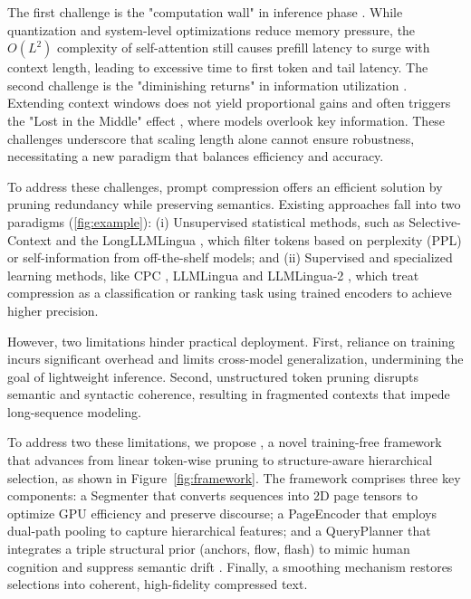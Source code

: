 \documentclass[11pt]{article}
\newcommand{\ours}{\text{BEAVER}\xspace}
\begin{document}
The first challenge is the "computation wall" in inference phase \cite{dao2022flashattention,zhao2025mofa}. While quantization \cite{lin2024awq} and system-level optimizations \cite{kwon2023efficient} reduce memory pressure, the $O(L^2)$ complexity of self-attention still causes prefill latency to surge with context length, leading to excessive time to first token and tail latency. The second challenge is the "diminishing returns" in information utilization \cite{sinha2025illusion}. Extending context windows does not yield proportional gains and often triggers the "Lost in the Middle" effect \cite{liu2024lost}, where models overlook key information. These challenges underscore that scaling length alone cannot ensure robustness, necessitating a new paradigm that balances efficiency and accuracy.

To address these challenges, prompt compression \cite{li2025prompt} offers an efficient solution by pruning redundancy while preserving semantics. Existing approaches fall into two paradigms (\ref{fig:example}): (i) Unsupervised statistical methods, such as Selective-Context \cite{li2023compressing} and the LongLLMLingua \cite{jiang2023llmlingua}, which filter tokens based on perplexity (PPL) or self-information from off-the-shelf models; and (ii) Supervised and specialized learning methods, like CPC \cite{liskavets2025prompt}, LLMLingua \cite{jiang2023llmlingua} and LLMLingua-2 \cite{pan2024llmlingua2}, which treat compression as a classification or ranking task using trained encoders to achieve higher precision.

However, two limitations hinder practical deployment. First, reliance on training incurs significant overhead and limits cross-model generalization, undermining the goal of lightweight inference. Second, unstructured token pruning disrupts semantic and syntactic coherence, resulting in fragmented contexts that impede long-sequence modeling.

To address two these limitations, we propose \ours, a novel training-free framework that advances from linear token-wise pruning to structure-aware hierarchical selection, as shown in Figure~\ref{fig:framework}. The framework comprises three key components: a Segmenter that converts sequences into 2D page tensors to optimize GPU efficiency and preserve discourse; a PageEncoder that employs dual-path pooling to capture hierarchical features; and a QueryPlanner that integrates a triple structural prior (anchors, flow, flash) to mimic human cognition and suppress semantic drift \cite{aytes2025sketch}. Finally, a smoothing mechanism restores selections into coherent, high-fidelity compressed text.
\end{document}
